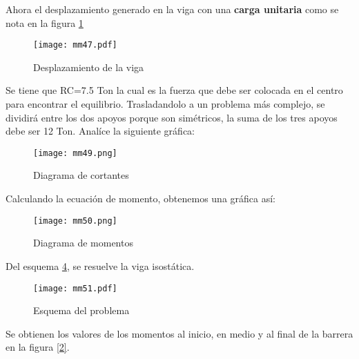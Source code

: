 Ahora el desplazamiento generado en la viga con una \textbf{carga unitaria} como se nota en la figura \ref{mm47}
\begin{figure}[h!]
\centering
\texttt{[image: mm47.pdf]}
\caption{Desplazamiento de la viga}
\label{mm47}
\end{figure}
Se tiene que RC=7.5 Ton la cual es la fuerza que debe ser colocada en el centro para encontrar el equilibrio.
Trasladandolo a un problema más complejo, se dividirá entre los dos apoyos porque son simétricos, la suma de los tres apoyos debe ser 12 Ton. Analíce la siguiente gráfica:
\begin{figure}[h!]
\centering
\texttt{[image: mm49.png]}
\caption{Diagrama de cortantes}
\label{mm49}
\end{figure}
Calculando la ecuación de momento, obtenemos una gráfica así:
\begin{figure}[h!]
\centering
\texttt{[image: mm50.png]}
\caption{Diagrama de momentos}
\label{mm50}
\end{figure}
%
%
%
%
%
%
%
Del esquema \ref{mm51}, se resuelve la viga isostática.
\begin{figure}[h!]
\centering
  \texttt{[image: mm51.pdf]}
  \caption{Esquema del problema}
  \label{mm51}
\end{figure}
Se obtienen los valores de los momentos al inicio, en medio y al final de la barrera en la figura \ref{2}.

